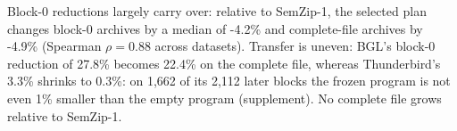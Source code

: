 Block-0 reductions largely carry over: relative to SemZip-1, the selected plan changes block-0 archives by a median of -4.2\% and complete-file archives by -4.9\% (Spearman $\rho=0.88$ across datasets). Transfer is uneven: BGL's block-0 reduction of 27.8\% becomes 22.4\% on the complete file, whereas Thunderbird's 3.3\% shrinks to 0.3\%: on 1,662 of its 2,112 later blocks the frozen program is not even 1\% smaller than the empty program (supplement). No complete file grows relative to SemZip-1.
